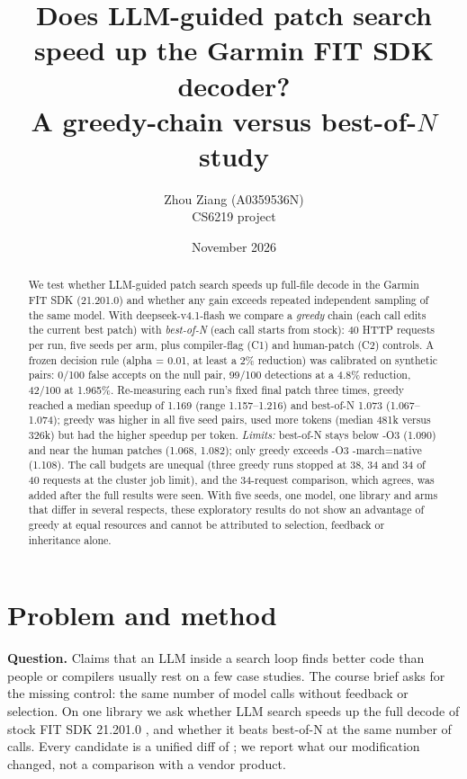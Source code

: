 \documentclass[10pt,a4paper]{article}
\title{\vspace{-1.2cm}Does LLM-guided patch search speed up the Garmin FIT SDK decoder?\\\large A greedy-chain versus best-of-$N$ study}
\author{Zhou Ziang (A0359536N)\\CS6219 project}
\date{November 2026}
\begin{document}
\maketitle\vspace{-0.6cm}
\begin{abstract}\noindent
We test whether LLM-guided patch search speeds up full-file decode in the Garmin FIT SDK (21.201.0) and whether any gain exceeds repeated independent sampling of the same model. With deepseek-v4.1-flash we compare a \emph{greedy} chain (each call edits the current best patch) with \emph{best-of-N} (each call starts from stock): 40 HTTP requests per run, five seeds per arm, plus compiler-flag (C1) and human-patch (C2) controls. A frozen decision rule (alpha = 0.01, at least a 2\% reduction) was calibrated on synthetic pairs: 0/100 false accepts on the null pair, 99/100 detections at a 4.8\% reduction, 42/100 at 1.965\%. Re-measuring each run's fixed final patch three times, greedy reached a median speedup of 1.169 (range 1.157--1.216) and best-of-N 1.073 (1.067--1.074); greedy was higher in all five seed pairs, used more tokens (median 481k versus 326k) but had the higher speedup per token. \emph{Limits:} best-of-N stays below -O3 (1.090) and near the human patches (1.068, 1.082); only greedy exceeds -O3 -march=native (1.108). The call budgets are unequal (three greedy runs stopped at 38, 34 and 34 of 40 requests at the cluster job limit), and the 34-request comparison, which agrees, was added after the full results were seen. With five seeds, one model, one library and arms that differ in several respects, these exploratory results do not show an advantage of greedy at equal resources and cannot be attributed to selection, feedback or inheritance alone.
\end{abstract}
\section{Problem and method}
\textbf{Question.} Claims that an LLM inside a search loop finds better code than people or compilers \cite{romera2024,novikov2025} usually rest on a few case studies. The course brief asks for the missing control: the same number of model calls without feedback or selection. On one library we ask whether LLM search speeds up the full decode of stock FIT SDK 21.201.0 \cite{garminfit}, and whether it beats best-of-N at the same number of calls. Every candidate is a unified diff of ; we report what our modification changed, not a comparison with a vendor product.
\end{document}
